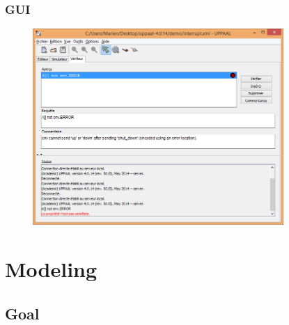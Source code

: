 \documentclass{bredelebeamer}
\begin{document}
\begin{frame}
	\frametitle{GUI}
	\begin{figure}
    	\centering
    	\includegraphics[width = 0.85\textwidth]{uppaal_verifier.png}
  	\end{figure}
\end{frame}

\section{Modeling}

\subsection{Goal}
\end{document}
